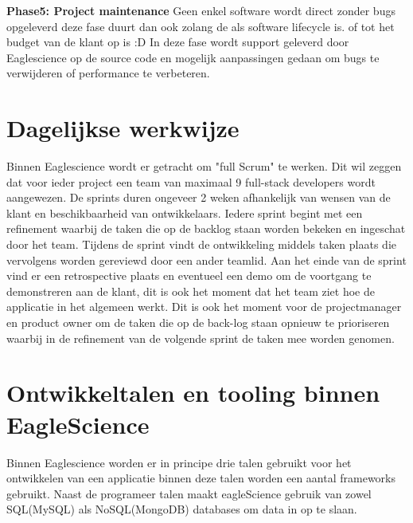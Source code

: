 \textbf{Phase5: Project maintenance}
Geen enkel software wordt direct zonder bugs opgeleverd deze fase duurt dan ook zolang de als software lifecycle is. of tot het budget van de klant op is :D In deze fase wordt support geleverd door Eaglescience op de source code en mogelijk aanpassingen gedaan om bugs te verwijderen of performance te verbeteren.

\section{Dagelijkse werkwijze}
Binnen Eaglescience wordt er getracht om "full Scrum" te werken. Dit wil zeggen dat voor ieder project een team van maximaal 9 full-stack developers wordt aangewezen. De sprints duren ongeveer 2 weken afhankelijk van wensen van de klant en beschikbaarheid van ontwikkelaars. Iedere sprint begint met een refinement waarbij de taken die op de backlog staan worden bekeken en ingeschat door het team. Tijdens de sprint vindt de ontwikkeling middels taken plaats die vervolgens worden gereviewd door een ander teamlid. Aan het einde van de sprint vind er een retrospective plaats en eventueel een demo om de voortgang te demonstreren aan de klant, dit is ook het moment dat het team ziet hoe de applicatie in het algemeen werkt. Dit is ook het moment voor de projectmanager en product owner om de taken die op de back-log staan opnieuw te prioriseren waarbij in de refinement van de volgende sprint de taken mee worden genomen.

\section{Ontwikkeltalen en tooling binnen EagleScience}
Binnen Eaglescience worden er in principe drie talen gebruikt voor het ontwikkelen van een applicatie binnen deze talen worden een aantal frameworks gebruikt. Naast de programeer talen maakt eagleScience gebruik van zowel SQL(MySQL) als NoSQL(MongoDB) databases om data in op te slaan.\\

